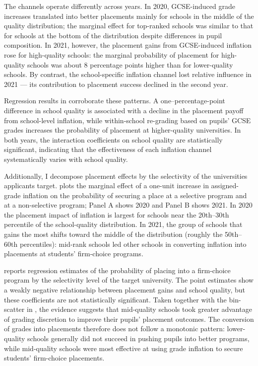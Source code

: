The channels operate differently across years. In 2020, GCSE-induced grade increases translated into better placements mainly for schools in the middle of the quality distribution; the marginal effect for top-ranked schools was similar to that for schools at the bottom of the distribution despite differences in pupil composition. In 2021, however, the placement gains from GCSE-induced inflation rose for high-quality schools: the marginal probability of placement for high-quality schools was about 8 percentage points higher than for lower-quality schools. By contrast, the school-specific inflation channel lost relative influence in 2021 — its contribution to placement success declined in the second year.

Regression results in  corroborate these patterns. A one–percentage-point difference in school quality is associated with a decline in the placement payoff from school-level inflation, while within-school re-grading based on pupils' GCSE grades increases the probability of placement at higher-quality universities. In both years, the interaction coefficients on school quality are statistically significant, indicating that the effectiveness of each inflation channel systematically varies with school quality.

Additionally, I decompose placement effects by the selectivity of the universities applicants target.  plots the marginal effect of a one-unit increase in assigned-grade inflation on the probability of securing a place at a selective program and at a non-selective program; Panel A shows 2020 and Panel B shows 2021. In 2020 the placement impact of inflation is largest for schools near the 20th–30th percentile of the school-quality distribution. In 2021, the group of schools that gains the most shifts toward the middle of the distribution (roughly the 50th–60th percentiles): mid-rank schools led other schools in converting inflation into placements at students’ firm-choice programs.

 reports regression estimates of the probability of placing into a firm-choice program by the selectivity level of the target university. The point estimates show a weakly negative relationship between placement gains and school quality, but these coefficients are not statistically significant. Taken together with the bin-scatter in , the evidence suggests that mid-quality schools took greater advantage of grading discretion to improve their pupils’ placement outcomes. The conversion of grades into placements therefore does not follow a monotonic pattern: lower-quality schools generally did not succeed in pushing pupils into better programs, while mid-quality schools were most effective at using grade inflation to secure students’ firm-choice placements.
